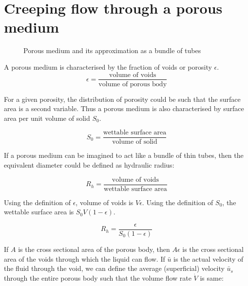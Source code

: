 \section{Creeping flow through a porous medium}

\begin{figure}[h]
\begin{center}
\end{center}
\caption{Porous medium and its approximation as a bundle of tubes}
\label{pfslfg}
\end{figure}

A porous medium is characterised by the fraction of voids or porosity $\epsilon$. 
$$ \epsilon = \frac{\text{volume of voids}}{\text{volume of porous body}} $$

For a given porosity, the distribution of porosity could be such that the surface area is a second variable. Thus a porous medium is also characterised by surface area per unit volume of solid $S_0$.

$$ S_0 = \frac{\text{wettable surface area}}{\text{volume of solid}} $$

If a porous medium can be imagined to act like a bundle of thin tubes, then the equivalent diameter could be defined as hydraulic radius:

$$ R_h = \frac{\text{volume of voids}}{\text{wettable surface area}}$$

Using the definition of $\epsilon$, volume of voids is $V\epsilon$. Using the definition of $S_0$, the wettable surface area is $S_0 V(1-\epsilon)$.

\begin{equation}
R_h = \frac{\epsilon}{S_0 (1-\epsilon)}
\label{rh}
\end{equation}

If $A$ is the cross sectional area of the porous body, then $A\epsilon$ is the cross sectional area of the voids through which the liquid can flow. If $\bar{u}$ is the actual velocity of the fluid through the void, we can define the average (superficial) velocity $\bar{u}_s$ through the entire porous body such that the volume flow rate $\dot{V}$ is same:

